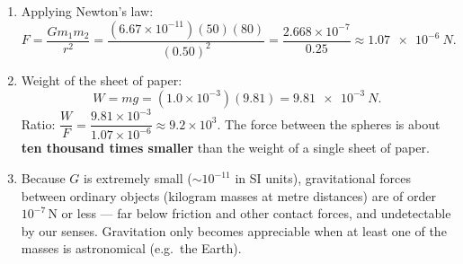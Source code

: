 \documentclass[11pt]{article}
\begin{document}
\begin{corrige}
\begin{enumerate}
\item Applying Newton's law:
\[
F = \frac{G m_1 m_2}{r^2} = \frac{(6.67\times10^{-11})(50)(80)}{(0.50)^2}
= \frac{2.668\times10^{-7}}{0.25}
\approx \SI{1.07e-6}{N}.
\]
\item Weight of the sheet of paper:
\[
W = mg = (1.0\times10^{-3})(9.81) = \SI{9.81e-3}{N}.
\]
Ratio: $\dfrac{W}{F} = \dfrac{9.81\times10^{-3}}{1.07\times10^{-6}} \approx 9.2\times10^{3}$. The force between the spheres is about \textbf{ten thousand times smaller} than the weight of a single sheet of paper.
\item Because $G$ is extremely small ($\sim 10^{-11}$ in SI units), gravitational forces between ordinary objects (kilogram masses at metre distances) are of order $10^{-7}$\,N or less — far below friction and other contact forces, and undetectable by our senses. Gravitation only becomes appreciable when at least one of the masses is astronomical (e.g.\ the Earth).
\end{enumerate}
\end{corrige}
\end{document}
